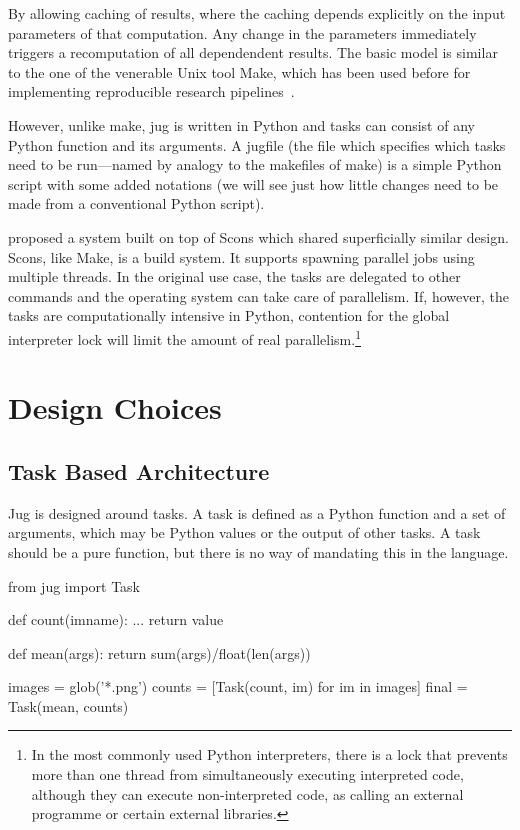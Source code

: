 \documentclass{article}
\begin{document}
By allowing caching of results, where the caching depends explicitly on the
input parameters of that computation. Any change in the parameters immediately
triggers a recomputation of all dependendent results. The basic model is
similar to the one of the venerable Unix tool Make, which has been used before
for implementing reproducible research
pipelines~\citep{Schwab00makingscientific}.

However, unlike make, jug is written in Python and tasks can consist of any
Python function and its arguments. A jugfile (the file which specifies which
tasks need to be run---named by analogy to the makefiles of make) is a simple
Python script with some added notations (we will see just how little changes
need to be made from a conventional Python script).

\citet{Fomel2007} proposed a system built on top of Scons which shared
superficially similar design. Scons, like Make, is a build system. It supports
spawning parallel jobs using multiple threads. In the original use case, the
tasks are delegated to other commands and the operating system can take care of
parallelism. If, however, the tasks are computationally intensive in Python,
contention for the global interpreter lock will limit the amount of real
parallelism.\footnote{In the most commonly used Python interpreters, there is a
lock that prevents more than one thread from simultaneously executing
interpreted code, although they can execute non-interpreted code, as calling an
external programme or certain external libraries.}

\section{Design Choices}
\subsection{Task Based Architecture}

Jug is designed around tasks. A task is defined as a Python function and a set
of arguments, which may be Python values or the output of other tasks. A task
should be a pure function, but there is no way of mandating this in the
language.

\begin{python}
from jug import Task

def count(imname):
    ...
    return value

def mean(args):
    return sum(args)/float(len(args))

images = glob('*.png')
counts = [Task(count, im) for im in images]
final = Task(mean, counts)
\end{python}
\end{document}
